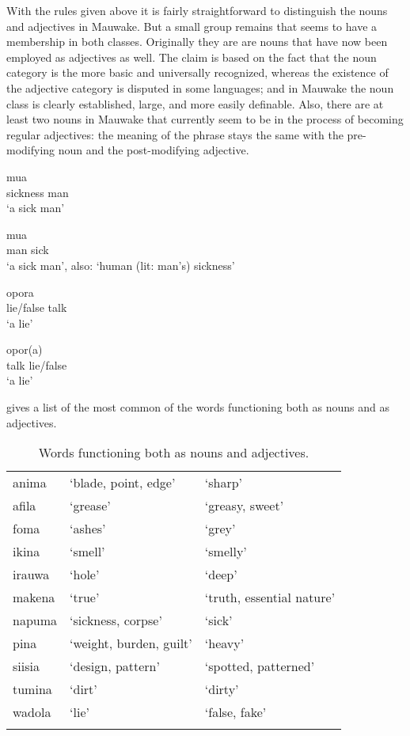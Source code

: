With the rules given above it is fairly straightforward to distinguish the nouns and adjectives in Mauwake. But a small group remains that seems to have a membership in both classes. Originally they are are nouns that have now been employed as adjectives as well. The claim is based on the fact that the noun category is the more basic and universally recognized, whereas the existence of the adjective category is disputed in some languages; and in Mauwake the noun class is clearly established, large, and more easily definable. Also, there are at least two nouns in Mauwake that currently seem to be in the process of becoming regular adjectives: the meaning of the phrase stays the same with the pre-modifying noun and the post-modifying adjective. 

\ea%
\label{ex:x107}
\gll {} mua\\
sickness man\\
\glt`a sick man'
\z

\ea%
\label{ex:x108}
\gll mua  \\
man sick\\
\glt`a sick man', also: `human (lit: man's) sickness'
\z

\ea%
\label{ex:x1822}
\gll {} opora \\
lie/false talk\\
\glt`a lie'
\z

\ea%
\label{ex:x1823}
\gll opor(a)  \\
talk lie/false\\
\glt`a lie'
\z

 gives a list of the most common of the words functioning both as nouns and as adjectives.

\begin{table}
 \caption{Words functioning both as nouns and adjectives.}
\label{tab:3:nounadj}

\begin{tabular}{lll}
\mytoprule
anima &`blade, point, edge' &`sharp'\\
afila &`grease' &`greasy, sweet'\\
foma &`ashes' &`grey'\\
ikina &`smell' &`smelly'\\
irauwa &`hole' &`deep'\\
makena &`true' &`truth, essential nature'\\
napuma &`sickness, corpse' &`sick'\\
pina &`weight, burden, guilt' &`heavy'\\
siisia &`design, pattern' &`spotted, patterned'\\
tumina &`dirt' &`dirty'\\
wadola &`lie' &`false, fake'\\
\mybottomrule
\end{tabular} 

\end{table}
